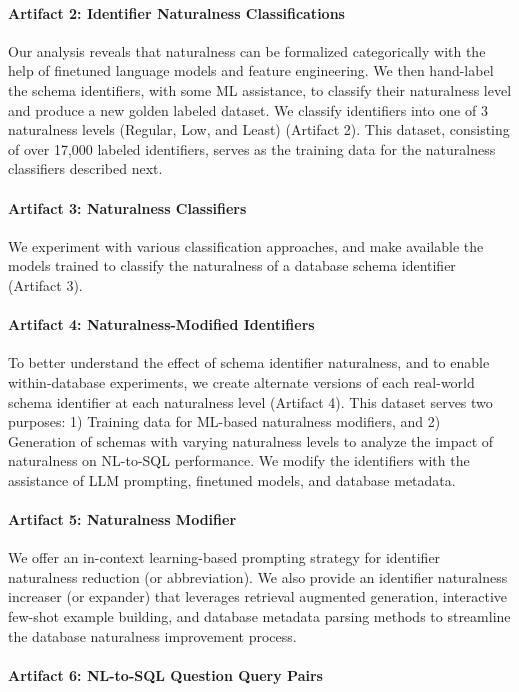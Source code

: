 \paragraph{Artifact 2: Identifier Naturalness Classifications}
Our analysis reveals that naturalness can be formalized categorically with the help of finetuned language models and feature engineering.
We then hand-label the schema identifiers, with some ML assistance, to classify their naturalness level and produce a new golden labeled dataset.
We classify identifiers into one of 3 naturalness levels (Regular, Low, and Least) (Artifact 2).
This dataset, consisting of over 17,000 labeled identifiers, serves as the training data for the naturalness classifiers described next.

\paragraph{Artifact 3: Naturalness Classifiers}
We experiment with various classification approaches, and make available the models trained to classify the naturalness of a database schema identifier (Artifact 3).

\paragraph{Artifact 4: Naturalness-Modified Identifiers}
To better understand the effect of schema identifier naturalness, and to enable within-database experiments, we create alternate versions of each real-world schema identifier at each naturalness level (Artifact 4).
This dataset serves two purposes: 1) Training data for ML-based naturalness modifiers, and 2) Generation of schemas with varying naturalness levels to analyze the impact of naturalness on NL-to-SQL performance.
We modify the identifiers with the assistance of LLM prompting, finetuned models, and database metadata.

\paragraph{Artifact 5: Naturalness Modifier}
We offer an in-context learning-based prompting strategy for identifier naturalness reduction (or abbreviation).
We also provide an identifier naturalness increaser (or expander) that leverages retrieval augmented generation, interactive few-shot example building, and database metadata parsing methods to streamline the database naturalness improvement process.

\paragraph{Artifact 6: NL-to-SQL Question Query Pairs}


